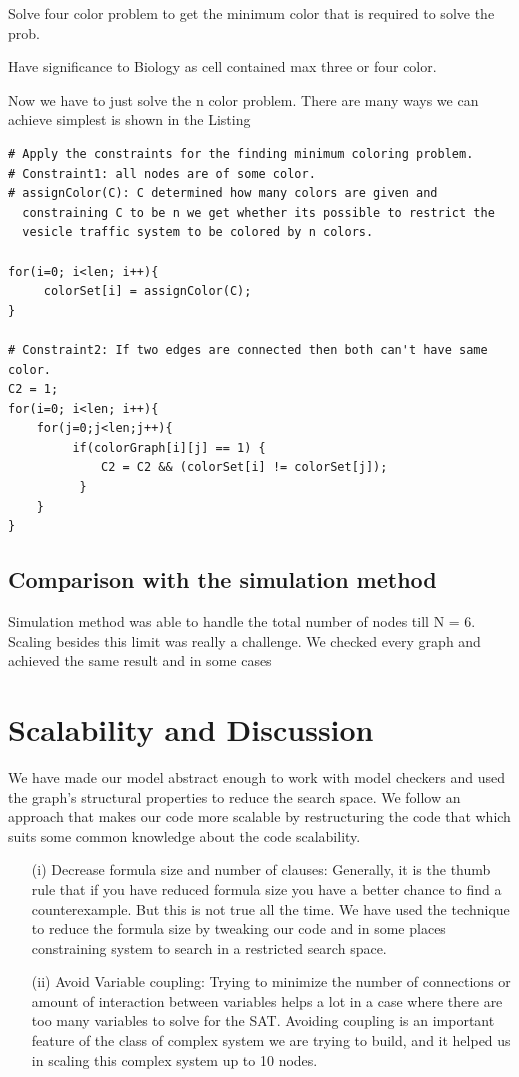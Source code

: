 \documentclass[preprint,12pt]{elsarticle}
\begin{document}
Solve four color problem to get the minimum color that is required to solve the prob.  

Have significance to Biology as cell contained max three or four color. 
     
     
Now we have to just solve the n color problem. There are many ways we can achieve simplest is shown in the Listing 
\begin{lstlisting}[mathescape,
  breaklines,
  frame=single,
  caption= \textbf{Necessary condition property.}
]
# Apply the constraints for the finding minimum coloring problem.
# Constraint1: all nodes are of some color.
# assignColor(C): C determined how many colors are given and 
  constraining C to be n we get whether its possible to restrict the 
  vesicle traffic system to be colored by n colors.
                   
for(i=0; i<len; i++){
     colorSet[i] = assignColor(C);
}

# Constraint2: If two edges are connected then both can't have same color.
C2 = 1;
for(i=0; i<len; i++){
	for(j=0;j<len;j++){
	     if(colorGraph[i][j] == 1) {
             C2 = C2 && (colorSet[i] != colorSet[j]); 
          }
    }
}
\end{lstlisting}

\subsection{Comparison with the simulation method}
Simulation method was able to handle the total number of nodes till N = 6. Scaling besides this limit was really a challenge. We checked every graph and achieved the same result and in some cases  

\section{Scalability and Discussion}
We have made our model abstract enough to work with model checkers and used the graph's structural properties to reduce the search space. We follow an approach that makes our code more scalable by restructuring the code that which suits some common knowledge about the code scalability.
\begin{enumerate}

\item[(i)] Decrease formula size and number of clauses: Generally, it is the thumb rule that if you have reduced formula size you have a better chance to find a counterexample. But this is not true all the time. We have used the technique to reduce the formula size by tweaking our code and in some places constraining system to search in a restricted search space. 

\item[(ii)] Avoid Variable coupling: Trying to minimize the number of connections or amount of interaction between variables helps a lot in a case where there are too many variables to solve for the SAT. Avoiding coupling is an important feature of the class of complex system we are trying to build, and it helped us in scaling this complex system up to 10 nodes.
\\ 
\end{enumerate}
\end{document}
